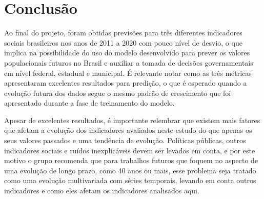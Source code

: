 \section{Conclusão}

Ao final do projeto, foram obtidas previsões para três diferentes indicadores sociais 
brasileiros nos anos de 2011 a 2020 com pouco nível de desvio, o que implica na possibilidade 
do uso do modelo desenvolvido para prever os valores populacionais futuros no Brasil e 
auxiliar a tomada de decisões governamentais em nível federal, estadual e municipal. É 
relevante notar como as três métricas apresentaram excelentes resultados para predição, 
o que é esperado quando a evolução futura dos dados segue o mesmo padrão de crescimento que 
foi apresentado durante a fase de treinamento do modelo.

Apesar de excelentes resultados, é importante relembrar que existem mais fatores que afetam 
a evolução dos indicadores avaliados neste estudo do que apenas os seus valores passados 
e uma tendência de evolução. Políticas públicas, outros indicadores sociais e ruídos 
inexplicáveis devem ser levados em conta, e por este motivo o grupo recomenda que para 
trabalhos futuros que foquem no aspecto de uma evolução de longo prazo, como 40 anos ou 
mais, esse problema seja tratado como uma evolução multivariada com séries temporais,
levando em conta outros indicadores e como eles afetam os indicadores analisados aqui.
